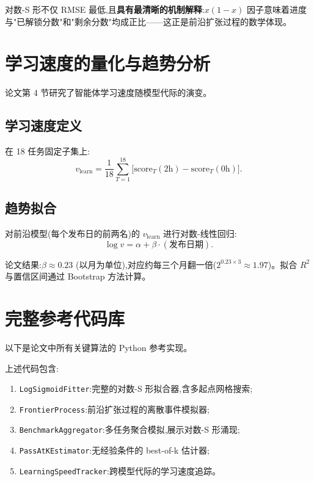 \documentclass[a4paper,11pt]{article}
\begin{document}
对数-S 形不仅 RMSE 最低,且\textbf{具有最清晰的机制解释}:$x(1-x)$ 因子意味着进度与"已解锁分数"和"剩余分数"均成正比——这正是前沿扩张过程的数学体现。

\section{学习速度的量化与趋势分析}

论文第 4 节研究了智能体学习速度随模型代际的演变。

\subsection{学习速度定义}

在 18 任务固定子集上:
\[
    v_{\mathrm{learn}} = \frac{1}{18}\sum_{T=1}^{18}\bigl[\mathrm{score}_{T}(2\text{h}) - \mathrm{score}_{T}(0\text{h})\bigr].
\tag{ALG-11}
\]

\subsection{趋势拟合}

对前沿模型(每个发布日的前两名)的 $v_{\mathrm{learn}}$ 进行对数-线性回归:
\[
    \log v = \alpha + \beta \cdot (\text{发布日期}).
\tag{ALG-12}
\]

论文结果:$\beta \approx 0.23$ (以月为单位),对应约每三个月翻一倍($2^{0.23 \times 3} \approx 1.97$)。拟合 $R^{2}$ 与置信区间通过 Bootstrap 方法计算。

\section{完整参考代码库}

以下是论文中所有关键算法的 Python 参考实现。



上述代码包含:
\begin{enumerate}
    \item \texttt{LogSigmoidFitter}:完整的对数-S 形拟合器,含多起点网格搜索;
    \item \texttt{FrontierProcess}:前沿扩张过程的离散事件模拟器;
    \item \texttt{BenchmarkAggregator}:多任务聚合模拟,展示对数-S 形涌现;
    \item \texttt{PassAtKEstimator}:无经验条件的 best-of-k 估计器;
    \item \texttt{LearningSpeedTracker}:跨模型代际的学习速度追踪。
\end{enumerate}
\end{document}
